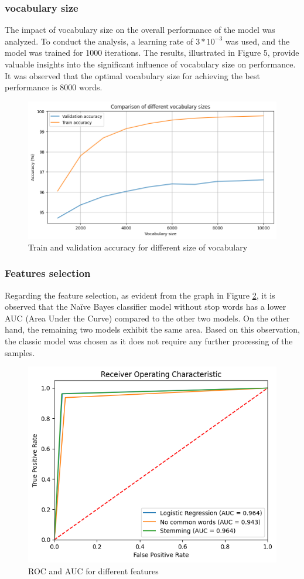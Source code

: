 \documentclass{class}
\begin{document}
\subsubsection*{vocabulary size}


The impact of vocabulary size on the overall performance of the model was analyzed.
To conduct the analysis, a learning rate of $3 * 10^{-3}$ was used, and the model was trained for 1000 iterations.
The results, illustrated in Figure 5, provide valuable insights into the significant influence of vocabulary size on performance.
It was observed that the optimal vocabulary size for achieving the best performance is 8000 words.

\begin{figure}[h]
    \centering
    \includegraphics[width=0.7\columnwidth]{images/lr_voc_size.png}
    \caption{Train and  validation accuracy for different size of vocabulary}
    \label{fig-5}
\end{figure}


\subsubsection*{Features selection}
Regarding the feature selection, as evident from the graph in Figure \ref{fig-6}, it is observed that the Na\"ive Bayes classifier model without
stop words has a lower AUC (Area Under the Curve) compared to the other two models.
On the other hand, the remaining two models exhibit the same area.
Based on this observation, the classic model was chosen as it does not require any further processing of the samples.
\begin{figure}[h]
    \centering
    \includegraphics[width=0.7\columnwidth]{images/logreg_ROC_features_sel.png}
    \caption{ROC and AUC for different features}
    \label{fig-6}
\end{figure}
\end{document}
